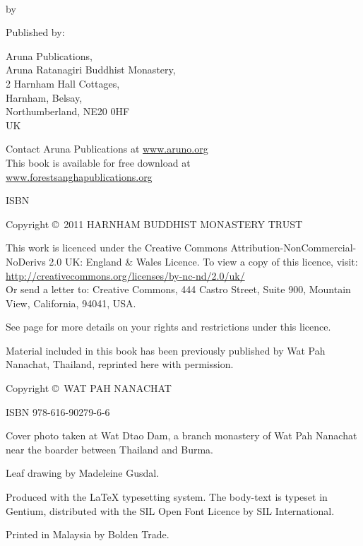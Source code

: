 {\smaller\setlength{\parskip}{0.8em}\setlength{\parindent}{0em}%
{\raggedright%

\bookTitle \\
by \bookAuthor

Published by:

Aruna Publications,\\
Aruna Ratanagiri Buddhist Monastery,\\
2 Harnham Hall Cottages,\\
Harnham, Belsay,\\
Northumberland, NE20 0HF\\
UK

Contact Aruna Publications at \href{http://aruno.org}{www.aruno.org}\\
This book is available for free download at\\
\href{http://forestsanghapublications.org/}{www.forestsanghapublications.org}

ISBN \bookISBN

Copyright \copyright\ 2011 HARNHAM BUDDHIST MONASTERY TRUST

\vfill

{\tiny

This work is licenced under the Creative Commons Attribution-NonCommercial-NoDerivs 2.0 UK: England \& Wales Licence. To view a copy of this licence, visit:\\
\href{http://creativecommons.org/licenses/by-nc-nd/2.0/uk/}{http://creativecommons.org/licenses/by-nc-nd/2.0/uk/}\\
Or send a letter to: Creative Commons, 444 Castro Street, Suite 900, Mountain View, California, 94041, USA.

See page \pageref{cc-details} for more details on your rights and restrictions under this licence.

Material included in this book has been previously published by Wat Pah Nanachat, Thailand, reprinted here with permission.

Copyright \copyright\ WAT PAH NANACHAT

ISBN 978-616-90279-6-6

Cover photo taken at Wat Dtao Dam, a branch monastery of Wat Pah Nanachat near the boarder between Thailand and Burma.

Leaf drawing by Madeleine Gusdal.

Produced with the {\selectfont\LaTeX} typesetting system. The body-text is typeset in Gentium, distributed with the SIL Open Font Licence by SIL International.

\editioninfo

Printed in Malaysia by Bolden Trade.

}

}}

